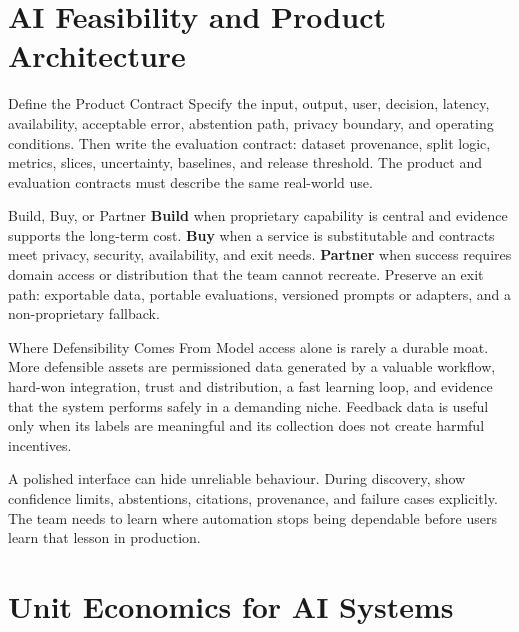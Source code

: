 \section{AI Feasibility and Product Architecture}

\begin{v3topic}{Define the Product Contract}
Specify the input, output, user, decision, latency, availability, acceptable
error, abstention path, privacy boundary, and operating conditions.
Then write the evaluation contract: dataset provenance, split logic, metrics,
slices, uncertainty, baselines, and release threshold.
The product and evaluation contracts must describe the same real-world use.

\end{v3topic}
\begin{v3topic}{Build, Buy, or Partner}
\textbf{Build} when proprietary capability is central and evidence supports
the long-term cost.
\textbf{Buy} when a service is substitutable and contracts meet privacy,
security, availability, and exit needs.
\textbf{Partner} when success requires domain access or distribution that the
team cannot recreate.
Preserve an exit path: exportable data, portable evaluations, versioned
prompts or adapters, and a non-proprietary fallback.

\end{v3topic}
\begin{v3topic}{Where Defensibility Comes From}
Model access alone is rarely a durable moat.
More defensible assets are permissioned data generated by a valuable workflow,
hard-won integration, trust and distribution, a fast learning loop, and
evidence that the system performs safely in a demanding niche.
Feedback data is useful only when its labels are meaningful and its collection
does not create harmful incentives.
\end{v3topic}

\begin{engineernote}
A polished interface can hide unreliable behaviour.
During discovery, show confidence limits, abstentions, citations, provenance,
and failure cases explicitly.
The team needs to learn where automation stops being dependable before users
learn that lesson in production.
\end{engineernote}

\section{Unit Economics for AI Systems}
\label{sec:startup-unit-economics}

